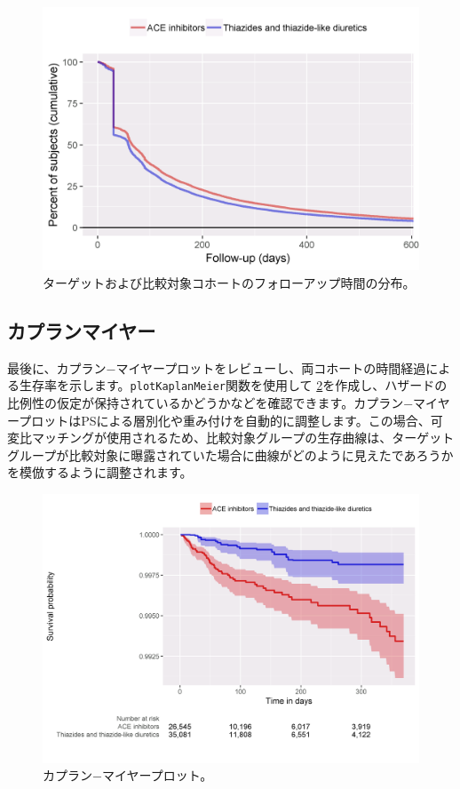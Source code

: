 \documentclass[
  11pt]{book}
\theoremstyle{definition}
\theoremstyle{definition}
\theoremstyle{definition}
\theoremstyle{definition}
\theoremstyle{remark}
\begin{document}
\begin{figure}

{\centering \includegraphics[width=0.8\linewidth]{images/PopulationLevelEstimation/followUp} 

}

\caption{ターゲットおよび比較対象コホートのフォローアップ時間の分布。}\label{fig:followUp}
\end{figure}

\subsection{カプランマイヤー}\label{ux30abux30d7ux30e9ux30f3ux30deux30a4ux30e4ux30fc}

最後に、カプラン−マイヤープロットをレビューし、両コホートの時間経過による生存率を示します。\texttt{plotKaplanMeier}関数を使用して \ref{fig:kmPlot}を作成し、ハザードの比例性の仮定が保持されているかどうかなどを確認できます。カプラン−マイヤープロットはPSによる層別化や重み付けを自動的に調整します。この場合、可変比マッチングが使用されるため、比較対象グループの生存曲線は、ターゲットグループが比較対象に曝露されていた場合に曲線がどのように見えたであろうかを模倣するように調整されます。  

\begin{figure}

{\centering \includegraphics[width=1\linewidth]{images/PopulationLevelEstimation/kmPlot} 

}

\caption{カプラン−マイヤープロット。}\label{fig:kmPlot}
\end{figure}
\end{document}
